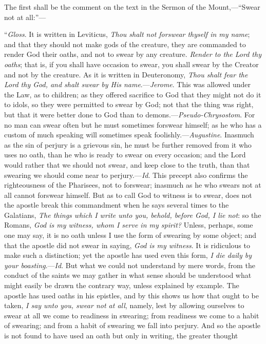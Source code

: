 The first shall be the comment on the text in the
Sermon of the Mount,—``Swear not at all:''—

``\emph{Gloss}. It is written in
Leviticus, \emph{Thou shalt not forswear thyself in my name}; and that
they should not make gods of the creature, they are commanded to render
God their oaths, and not to swear by any creature. \emph{Render to the Lord
thy oaths}; that is, if you shall have occasion to swear, you shall
swear by the Creator and not by the creature. As it is written in
Deuteronomy, \emph{Thou shalt fear the Lord thy God, and shalt swear by His
name}.—\emph{Jerome}. This was allowed under the Law, as to
children; as they offered sacrifice to God that they might not do it to
idols, so they were permitted to swear by God; not that the thing was
right, but that it were better done to God than to demons.—\emph{Pseudo-Chrysostom}.
For no man can swear often but he must sometimes forswear himself; as he
who has a custom of much speaking will sometimes speak foolishly.—\emph{Augustine}.
Inasmuch as the sin of perjury is a grievous sin, he must be further
removed from it who uses no oath, than he who is ready to swear on every
occasion; and the Lord would rather that we should not swear, and keep
close to the truth, than that swearing we should come near to
perjury.—\emph{Id}. This precept also confirms the righteousness of
the Pharisees, not to forswear; inasmuch as he who swears not at all
cannot forswear himself. But as to call God to witness is to swear, does
not the apostle break this commandment when he says several times to the
Galatians, \emph{The things which I write unto you, behold, before God, I
lie not}: so the Romans, \emph{God is my witness, whom I serve in my
spirit?} Unless, perhaps, some one may say, it is no oath unless I
use the form of swearing by some object; and that the apostle did not
swear in saying, \emph{God is my witness}. It is ridiculous to make such
a distinction; yet the apostle has used even this form, \emph{I die daily
by your boasting}.—\emph{Id}. But what we could not understand by
mere words, from the conduct of the saints we may gather in what sense
should be understood what might easily be drawn the contrary way, unless
explained by example. The apostle has used oaths in his epistles, and by
this shows us how that ought to be taken, \emph{I say unto you, swear not
at all}, namely, lest by allowing ourselves to swear at all we come
to readiness in swearing; from readiness we come to a habit of swearing;
and from a habit of swearing we fall into perjury. And so the apostle is
not found to have used an oath but only in writing, the greater thought
